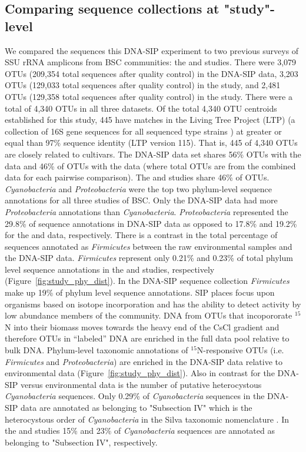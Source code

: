 \subsection{Comparing sequence collections at "study"-level} We compared the
sequences this DNA-SIP experiment to two previous surveys of SSU rRNA
amplicons from BSC communities: the \citet{Garcia_Pichel_2013} and
\citet{Steven_2013} studies. There were 3,079 OTUs (209,354 total sequences after
quality control) in the DNA-SIP data, 3,203 OTUs (129,033 total sequences after
quality control) in the \citet{Garcia_Pichel_2013} study, and 2,481 OTUs
(129,358 total sequences after quality control) in the \citet{Steven_2013}
study. There were a total of 4,340 OTUs in all three datasets. Of the total
4,340 OTU centroids established for this study, 445 have matches in the Living
Tree Project (LTP) (a collection of 16S gene sequences for all sequenced type
strains \citep{Yarza_2008}) at greater or equal than 97\% sequence identity
(LTP version 115). That is, 445 of 4,340 OTUs are closely related to cultivars.
The DNA-SIP data set shares 56\% OTUs with the \citet{Steven_2013} data and
46\% of OTUs with the \citet{Garcia_Pichel_2013} data (where total OTUs are
from the combined data for each pairwise comparison).  The \citet{Steven_2013}
and \citet{Garcia_Pichel_2013} studies share 46\% of OTUs.
\textit{Cyanobacteria} and \textit{Proteobacteria} were the top two
phylum-level sequence annotations for all three studies of BSC. Only the
DNA-SIP data had more \textit{Proteobacteria} annotations than
\textit{Cyanobacteria}.  \textit{Proteobacteria} represented the 29.8\% of
sequence annotations in DNA-SIP data as opposed to 17.8\% and 19.2\% for the
\citet{Garcia_Pichel_2013} and \citet{Steven_2013} data, respectively.  There
is a contrast in the total percentage of sequences annotated as
\textit{Firmicutes} between the raw environmental samples and the DNA-SIP data.
\textit{Firmicutes} represent only 0.21\% and 0.23\% of total phylum level
sequence annotations in the \citet{Steven_2013} and \citet{Garcia_Pichel_2013}
studies, respectively (Figure~\ref{fig:study_phy_dist}). In the DNA-SIP
sequence collection \textit{Firmicutes} make up 19\% of phylum level sequence
annotations. SIP places focus upon organisms based on isotope incorporation and
has the ability to detect activity by low abundance members of the community.
DNA from OTUs that incopororate $^{15}$N into their biomass moves towards the
heavy end of the CsCl gradient and therefore OTUs in ``labeled'' DNA are
enriched in the full data pool relative to bulk DNA.  Phylum-level taxonomic
annotations of $^{15}$N-responsive OTUs (i.e. \textit{Firmicutes} and
\textit{Proteobacteria}) are enriched in the DNA-SIP data relative to
environmental data (Figure~\ref{fig:study_phy_dist}). Also in contrast
for the DNA-SIP versus environmental data is the number of putative
heterocystous \textit{Cyanobacteria} sequences. Only 0.29\% of
\textit{Cyanobacteria} sequences in the DNA-SIP data are annotated as belonging
to "Subsection IV" which is the heterocystous order of \textit{Cyanobacteria}
in the Silva taxonomic nomenclature \citep{17947321}. In the
\citet{Steven_2013} and \citet{Garcia_Pichel_2013} studies 15\% and 23\% 
of \textit{Cyanobacteria} sequences are annotated as belonging to
"Subsection IV", respectively.
